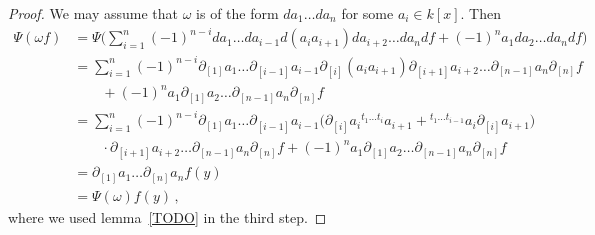 \documentclass{compositio}
\theoremstyle{definition}
\numberwithin{equation}{section}
\begin{document}
\begin{proof}
We may assume that $\omega$ is of the form $da_1\ldots da_n$ for some $a_i\in k[x]$. Then
\begin{align*}
\Psi(\omega f) & = \Psi \Big( \sum_{i=1}^n (-1)^{n-i} da_1\ldots da_{i-1} d(a_i a_{i+1}) da_{i+2}\ldots da_n df + (-1)^n a_1 da_2\ldots da_n df \Big) \\
& = \sum_{i=1}^n (-1)^{n-i} \partial_{[1]} a_1\ldots \partial_{[i-1]} a_{i-1} \partial_{[i]} (a_i a_{i+1}) \partial_{[i+1]} a_{i+2} \ldots \partial_{[n-1]} a_n \partial_{[n]} f \\
& \qquad + (-1)^n a_1 \partial_{[1]} a_2 \ldots \partial_{[n-1]} a_n \partial_{[n]} f \\
& = \sum_{i=1}^n (-1)^{n-i} \partial_{[1]} a_1\ldots \partial_{[i-1]} a_{i-1} \Big(\partial_{[i]} a_i {}	^{t_1\ldots t_i}a_{i+1} + {}^{t_1\ldots t_{i-1}} a_i \partial_{[i]} a_{i+1} \Big) \\
& \qquad \cdot  \partial_{[i+1]} a_{i+2} \ldots \partial_{[n-1]} a_n \partial_{[n]} f + (-1)^n a_1 \partial_{[1]} a_2 \ldots \partial_{[n-1]} a_n \partial_{[n]} f \\
& = \partial_{[1]} a_1 \ldots \partial_{[n]} a_n f(y) \\
& = \Psi(\omega) f(y) \, ,
\end{align*}
where we used lemma~\ref{TODO} in the third step. 
\end{proof}
\end{document}
